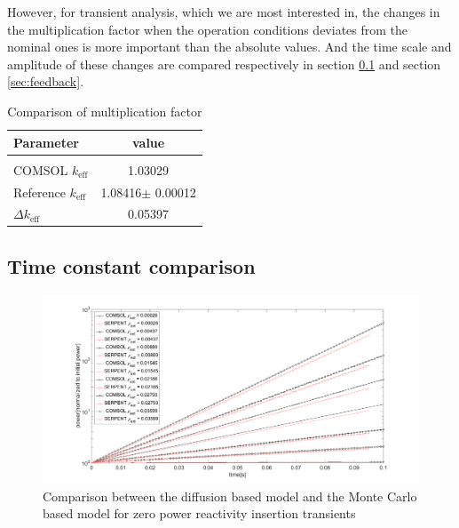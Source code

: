 \documentclass{elsarticle}
\newcommand{\keff}{{\ensuremath{k_{\mathrm{eff}}}} }
\begin{document}
However, for transient analysis, which we are most interested in, the changes in the multiplication factor when the operation conditions deviates from the nominal ones is more important than the absolute values.
And the time scale and amplitude of these changes are compared respectively in section \ref{sec:time_scale} and section \ref{sec:feedback}.

\begin{table}
\centering
  \begin{tabular}{lc}
  \hline
        Parameter & value \\
        \hline\\
       COMSOL \keff & 1.03029  \\
       Reference \keff & 1.08416$\pm$ 0.00012\\
       $\Delta$\keff & 0.05397\\
       \hline
  \end{tabular}
  \caption{Comparison of multiplication factor}
  \label{tab:keff}
\end{table}






\subsection{Time constant comparison}
\label{sec:time_scale}

\begin{figure}[h]
  \centering
  \includegraphics[width=\columnwidth]{./images/benchmark/zero_power_transient.png}
  \caption{Comparison between the diffusion based model and the Monte Carlo based model for zero power reactivity insertion transients}
  \label{fig:zero_power}
\end{figure}
\end{document}

